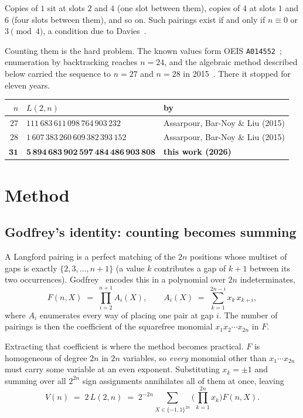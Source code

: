 \documentclass[11pt,a4paper]{article}
\begin{document}
\noindent
Copies of $1$ sit at slots $2$ and $4$ (one slot between them), copies of $4$ at
slots $1$ and $6$ (four slots between them), and so on. Such pairings exist if
and only if $n \equiv 0$ or $3 \pmod 4$, a condition due to Davies~\cite{davies}.

Counting them is the hard problem. The known values form OEIS
\texttt{A014552}~\cite{oeis}; enumeration by backtracking reaches $n=24$, and the
algebraic method described below carried the sequence to $n=27$ and $n=28$ in
2015~\cite{abl}. There it stopped for eleven years.

\begin{center}
\begin{tabular}{@{}rll@{}}
\toprule
$n$ & $L(2,n)$ & by \\
\midrule
$27$ & $111\,683\,611\,098\,764\,903\,232$ & Assarpour, Bar-Noy \& Liu (2015) \\
$28$ & $1\,607\,383\,260\,609\,382\,393\,152$ & Assarpour, Bar-Noy \& Liu (2015) \\
$\mathbf{31}$ & $\mathbf{5\,894\,683\,902\,597\,484\,486\,903\,808}$ & \textbf{this work (2026)} \\
\bottomrule
\end{tabular}
\end{center}

\section{Method}

\subsection{Godfrey's identity: counting becomes summing}

A Langford pairing is a perfect matching of the $2n$ positions whose multiset of
gaps is exactly $\{2,3,\dots,n+1\}$ (a value $k$ contributes a gap of $k+1$
between its two occurrences). Godfrey~\cite{godfrey} encodes this in a
polynomial over $2n$ indeterminates,
\begin{equation}
  F(n,X) \;=\; \prod_{i=2}^{n+1} A_i(X),
  \qquad
  A_i(X) \;=\; \sum_{k=1}^{2n-i} x_k\,x_{k+i},
  \label{eq:F}
\end{equation}
where $A_i$ enumerates every way of placing one pair at gap $i$. The number of
pairings is then the coefficient of the squarefree monomial
$x_1 x_2 \cdots x_{2n}$ in $F$.

Extracting that coefficient is where the method becomes practical. $F$ is
homogeneous of degree $2n$ in $2n$ variables, so \emph{every} monomial other
than $x_1\cdots x_{2n}$ must carry some variable at an even exponent.
Substituting $x_k = \pm 1$ and summing over all $2^{2n}$ sign assignments
annihilates all of them at once, leaving
\begin{equation}
  V(n) \;=\; 2\,L(2,n) \;=\; 2^{-2n}
  \sum_{X \in \{-1,1\}^{2n}} \Big( \prod_{k=1}^{2n} x_k \Big) F(n,X).
  \label{eq:godfrey}
\end{equation}
\end{document}
